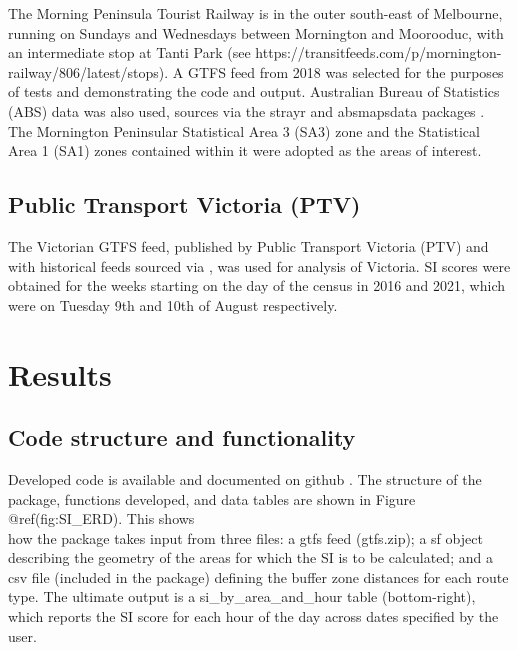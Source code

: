 \documentclass[preprint, 3p,
authoryear]{elsarticle} %
\begin{document}
The Morning Peninsula Tourist Railway is in the outer south-east of
Melbourne, running on Sundays and Wednesdays between Mornington and
Moorooduc, with an intermediate stop at Tanti Park (see
https://transitfeeds.com/p/mornington-railway/806/latest/stops). A GTFS
feed from 2018 was selected for the purposes of tests and demonstrating
the code and output. Australian Bureau of Statistics (ABS) data was also
used, sources via the strayr and absmapsdata packages \citep{r-strayr}.
The Mornington Peninsular Statistical Area 3 (SA3) zone and the
Statistical Area 1 (SA1) zones contained within it were adopted as the
areas of interest.

\hypertarget{public-transport-victoria-ptv}{%
\subsection{Public Transport Victoria
(PTV)}\label{public-transport-victoria-ptv}}

The Victorian GTFS feed, published by Public Transport Victoria (PTV)
and with historical feeds sourced via
\citet{transitfeeds_victoria:2023aa}, was used for analysis of Victoria.
SI scores were obtained for the weeks starting on the day of the census
in 2016 and 2021, which were on Tuesday 9th and 10th of August
respectively.

\hypertarget{results}{%
\section{Results}\label{results}}

\hypertarget{code-structure-and-functionality}{%
\subsection{Code structure and
functionality}\label{code-structure-and-functionality}}

Developed code is available and documented on github
\citep{gtfssupplyindex_github}. The structure of the package, functions
developed, and data tables are shown in Figure @ref(fig:SI\_ERD). This
shows\\
how the package takes input from three files: a gtfs feed (gtfs.zip); a
sf object describing the geometry of the areas for which the SI is to be
calculated; and a csv file (included in the package) defining the buffer
zone distances for each route type. The ultimate output is a
si\_by\_area\_and\_hour table (bottom-right), which reports the SI score
for each hour of the day across dates specified by the user.
\end{document}
